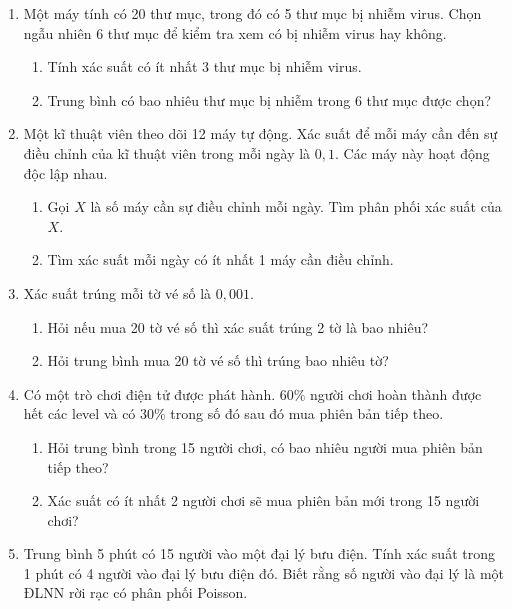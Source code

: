 \documentclass[12pt,a4paper]{article}
\theoremstyle{definition}
\begin{document}
\begin{enumerate}[label=\textbf{\arabic*.}]
    \item Một máy tính có 20 thư mục, trong đó có 5 thư mục bị nhiễm virus. Chọn ngẫu nhiên 6 thư mục để kiểm tra xem có bị nhiễm virus hay không.
    \begin{enumerate}[label=\alph*)]
        \item Tính xác suất có ít nhất 3 thư mục bị nhiễm virus.
        \item Trung bình có bao nhiêu thư mục bị nhiễm trong 6 thư mục được chọn?
    \end{enumerate}

    \item Một kĩ thuật viên theo dõi 12 máy tự động. Xác suất để mỗi máy cần đến sự điều chỉnh của kĩ thuật viên trong mỗi ngày là $0{,}1$. Các máy này hoạt động độc lập nhau.
    \begin{enumerate}[label=\alph*)]
        \item Gọi $X$ là số máy cần sự điều chỉnh mỗi ngày. Tìm phân phối xác suất của $X$.
        \item Tìm xác suất mỗi ngày có ít nhất 1 máy cần điều chỉnh.
    \end{enumerate}

    \item Xác suất trúng mỗi tờ vé số là $0{,}001$.
    \begin{enumerate}[label=\alph*)]
        \item Hỏi nếu mua 20 tờ vé số thì xác suất trúng 2 tờ là bao nhiêu?
        \item Hỏi trung bình mua 20 tờ vé số thì trúng bao nhiêu tờ?
    \end{enumerate}

    \item Có một trò chơi điện tử được phát hành. $60\%$ người chơi hoàn thành được hết các level và có $30\%$ trong số đó sau đó mua phiên bản tiếp theo.
    \begin{enumerate}[label=\alph*)]
        \item Hỏi trung bình trong 15 người chơi, có bao nhiêu người mua phiên bản tiếp theo?
        \item Xác suất có ít nhất 2 người chơi sẽ mua phiên bản mới trong 15 người chơi?
    \end{enumerate}

    \item Trung bình 5 phút có 15 người vào một đại lý bưu điện. Tính xác suất trong 1 phút có 4 người vào đại lý bưu điện đó. Biết rằng số người vào đại lý là một ĐLNN rời rạc có phân phối Poisson.


\end{enumerate}
\end{document}
